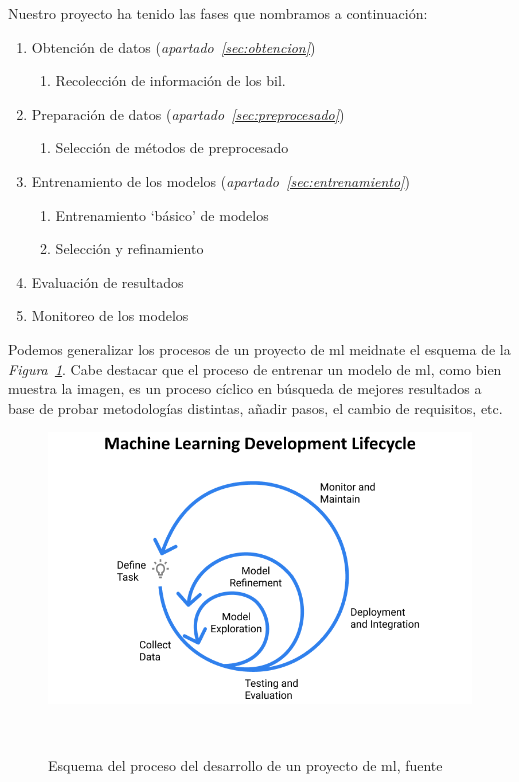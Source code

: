 Nuestro proyecto ha tenido las fases que nombramos a continuación:

\begin{enumerate}
    \item Obtención de datos (\textit{apartado\ \ref{sec:obtencion}})
        \begin{enumerate}
            \item Recolección de información de los \acrshort{bil}.
        \end{enumerate}
    \item Preparación de datos (\textit{apartado\ \ref{sec:preprocesado}})
        \begin{enumerate}
            \item Selección de métodos de preprocesado
        \end{enumerate}
    \item Entrenamiento de los modelos (\textit{apartado\ \ref{sec:entrenamiento}})
        \begin{enumerate}
            \item Entrenamiento `básico' de modelos
            \item Selección y refinamiento
        \end{enumerate}
    \item Evaluación de resultados
        
    \item Monitoreo de los modelos
\end{enumerate}

Podemos generalizar los procesos de un proyecto de \gls{ml} meidnate el esquema de la \textit{Figura\ \ref{fig:ml-development-cycle}}. Cabe destacar que el proceso de entrenar un modelo de \gls{ml}, como bien muestra la imagen, es un proceso cíclico en búsqueda de mejores resultados a base de probar metodologías distintas, añadir pasos, el cambio de requisitos, etc.

\begin{figure}[!htb]
    \centering
    \includegraphics[width=\linewidth]{media/images/ml-development-cycle.png}
    \caption{Esquema del proceso del desarrollo de un proyecto de \gls{ml}, fuente\ \cite{Organizi22:online}}\ \label{fig:ml-development-cycle}
\end{figure}


